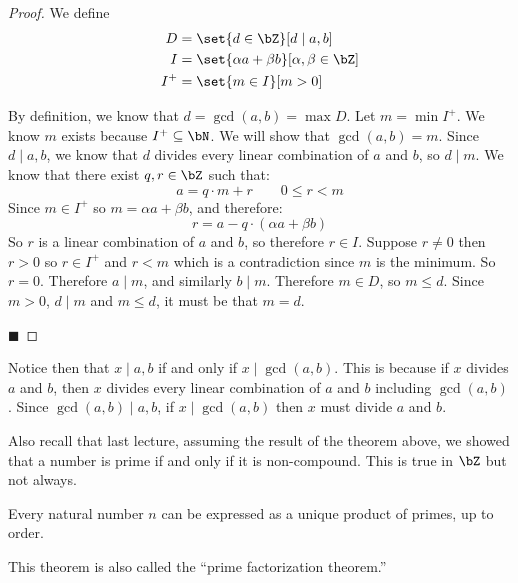 \documentclass[10pt]{article}
\let\divides=\mid
\begin{document}
\begin{proof}

    We define 
    \begin{align*}
        D &= \set{d\in\bZ}[d\divides a,b] \\
        I &= \set{\alpha a+\beta b}[\alpha,\beta\in\bZ] \\
        I^+ &= \set{m\in I}[m>0]
    \end{align*}

    By definition, we know that $d=\gcd(a,b)=\max D$.
    Let $m=\min I^+$.
    We know $m$ exists because $I^+\subseteq\bN$.
    We will show that $\gcd(a,b)=m$.
    Since $d\divides a,b$, we know that $d$ divides every linear combination of $a$ and $b$, so $d\divides m$.
    We know that there exist $q,r\in\bZ$ such that:
    \[ a = q\cdot m + r\qquad 0\leq r<m \]
    Since $m\in I^+$ so $m=\alpha a + \beta b$, and therefore:
    \[ r = a - q\cdot(\alpha a + \beta b) \]
    So $r$ is a linear combination of $a$ and $b$, so therefore $r\in I$.
    Suppose $r\neq0$ then $r>0$ so $r\in I^+$ and $r<m$ which is a contradiction since $m$ is the minimum.
    So $r=0$.
    Therefore $a\divides m$, and similarly $b\divides m$.
    Therefore $m\in D$, so $m\leq d$.
    Since $m>0$, $d\divides m$ and $m\leq d$, it must be that $m=d$.

    \hfill$\blacksquare$

\end{proof}

Notice then that $x\divides a,b$ if and only if $x\divides\gcd(a,b)$.
This is because if $x$ divides $a$ and $b$, then $x$ divides every linear combination of $a$ and $b$ including $\gcd(a,b)$.
Since $\gcd(a,b)\divides a,b$, if $x\divides\gcd(a,b)$ then $x$ must divide $a$ and $b$.

Also recall that last lecture, assuming the result of the theorem above, we showed that a number is prime if and only if it is non-compound.
This is true in $\bZ$ but not always.

\newpage
\begin{thrm*}

    Every natural number $n$ can be expressed as a unique product of primes, up to order.

\end{thrm*}

This theorem is also called the ``prime factorization theorem.''
\end{document}
